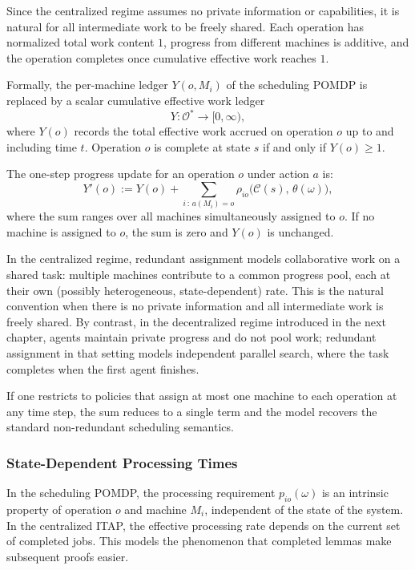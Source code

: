 Since the centralized regime assumes no private information or capabilities, it is
natural for all intermediate work to be freely shared. Each operation has normalized
total work content $1$, progress from different machines is additive, and the
operation completes once cumulative effective work reaches $1$.

Formally, the per-machine ledger $Y(o, M_i)$ of the scheduling POMDP is replaced by
a scalar cumulative effective work ledger
\[
Y : \mathcal{O}^* \to [0, \infty),
\]
where $Y(o)$ records the total effective work accrued on operation $o$ up to and
including time $t$. Operation $o$ is complete at state $s$ if and only if
$Y(o) \ge 1$.

The one-step progress update for an operation $o$ under action $a$ is:
\[
Y'(o) := Y(o) + \sum_{i\,:\, a(M_i) = o}
\rho_{io}\bigl(\mathcal{C}(s),\, \theta(\omega)\bigr),
\]
where the sum ranges over all machines simultaneously assigned to $o$. If no machine
is assigned to $o$, the sum is zero and $Y(o)$ is unchanged.

\begin{remark}
In the centralized regime, redundant assignment models collaborative work on a shared
task: multiple machines contribute to a common progress pool, each at their own
(possibly heterogeneous, state-dependent) rate. This is the natural convention when
there is no private information and all intermediate work is freely shared. By
contrast, in the decentralized regime introduced in the next chapter, agents maintain
private progress and do not pool work; redundant assignment in that setting models
independent parallel search, where the task completes when the first agent finishes.
\end{remark}

\begin{remark}
If one restricts to policies that assign at most one machine to each operation at any
time step, the sum reduces to a single term and the model recovers the standard
non-redundant scheduling semantics.
\end{remark}

\subsubsection{State-Dependent Processing Times}

In the scheduling POMDP, the processing requirement $p_{io}(\omega)$ is an intrinsic
property of operation $o$ and machine $M_i$, independent of the state of the system.
In the centralized ITAP, the effective processing rate depends on the current set of
completed jobs. This models the phenomenon that completed lemmas make subsequent
proofs easier.

